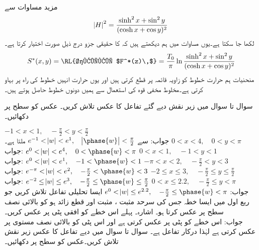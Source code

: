 مزید مساوات  سے
\begin{align*}
\abs{H}^2=\frac{\sinh^2x+\sin^2y}{(\cosh x+\cos y)^2}
\end{align*}
لکھا جا سکتا ہے۔یوں مساوات  میں ہم دیکھتے ہیں کہ  کا حقیقی جزو درج ذیل صورت اختیار کرتا ہے۔
\begin{align*}
S^*(x,y)=\text{\RL{حقیقی $F^*(z)\,$}}=\frac{T_0}{\pi}\ln \frac{\sinh^2x+\sin^2y}{(\cosh x+\cos y)^2}
\end{align*}
منحنیات  ہم حرارت خطوط  کو زاویہ قائمہ پر قطع کرتی ہیں اور یوں حرارت انہیں خطوط کی راہ  پر بہاو کرتی ہے۔مخلوط مخفی قوہ کی استعمال سے ہمیں دونوں خطوط حاصل ہوتے ہیں۔

سوال  تا سوال  میں زیر نقش  دیے گئے تفاعل کا عکس تلاش کریں۔ عکس کو  سطح پر دکھائیں۔

\quad
$-1<x<1,\quad -\tfrac{\pi}{2}<y<\tfrac{\pi}{2}$\\
جواب:\quad
{} سے 
$e^{-1}<\abs{w}<e^1,\quad \abs{\phase{w}}<\tfrac{\pi}{2}$
ملتا ہے۔
\quad
$0<x<4,\quad 0<y<\pi$\\
جواب:\quad
$e^0<\abs{w}<e^4,\quad 0<\phase{w}<\pi$
\quad
$0<x<1,\quad -1<y<1$\\
جواب:\quad
$e^0<\abs{w}<e^1,\quad -1<\phase{w}<1$
\quad
$-\pi<x<2,\quad -\tfrac{\pi}{2}<y<3$\\
جواب:\quad
$e^{-\pi}<\abs{w}<e^2,\quad -\tfrac{\pi}{2}<\phase{w}<3$
\quad
$-2\le x\le 3,\quad -\tfrac{\pi}{2}\le y\le \tfrac{\pi}{2}$\\
جواب:\quad
$e^{-2}\le \abs{w}\le e^3,\quad -\tfrac{\pi}{2}\le \phase{w}\le \tfrac{\pi}{2}$
\quad
$0< x\le 2.2,\quad -\tfrac{\pi}{2}\le y< \pi$\\
جواب:\quad
$e^{0}< \abs{w}\le e^{2.2},\quad -\tfrac{\pi}{2}\le \phase{w}< \pi$
\quad
ایسا تحلیلی تفاعل تلاش کریں جو ربع اول میں ایسا خطہ جس کی سرحد مثبت ، مثبت  اور قطع زائد   ہو کو بالائی نصف سطح پر عکس کرتا ہو۔ اشارہ۔ پہلے اس خطے کو افقی پٹی پر عکس کریں۔\\
جواب:\quad
{} اس خطے کو  پٹی  پر عکس کرتی ہے اور  اس پٹی کو بالائی نصف مستوی پر عکس کرتی ہے لہٰذا درکار تفاعل  ہے۔
سوال  تا سوال  میں دیے تفاعل کا عکس زیر نقش  تلاش کریں۔عکس کو  سطح پر دکھائیں۔

